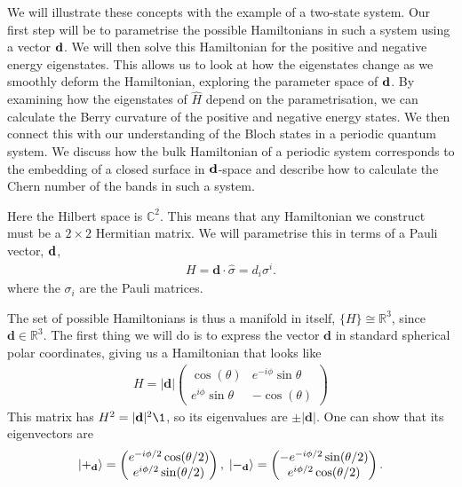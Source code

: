 We will illustrate these concepts with the example of a two-state system. Our first step will be to parametrise the possible Hamiltonians in such a system using a vector $\bf d$. We will then solve this Hamiltonian for the positive and negative energy eigenstates. This allows us to look at how the eigenstates change as we smoothly deform the Hamiltonian, exploring the parameter space of $\bf d$. By examining how the eigenstates of $\hat H$ depend on the parametrisation, we can calculate the Berry curvature of the positive and negative energy states. We then connect this with our understanding of the Bloch states in a periodic quantum system. We discuss how the bulk Hamiltonian of a periodic system corresponds to the embedding of a closed surface in $\bf d$-space and describe how to calculate the Chern number of the bands in such a system.\par
Here the Hilbert space is $\mathbb{C}^2$. This means that any Hamiltonian we construct must be a $2\times 2$ Hermitian matrix. We will parametrise this in terms of a Pauli vector, $\bf d$,
\begin{align}
    H = \textbf{d}\cdot\hat{\sigma}  = d_i \sigma^i.
\end{align}
where the $\sigma_i$ are the Pauli matrices.\par
The set of possible Hamiltonians is thus a manifold in itself, $ \{H\} \cong \mathbb{R}^3 $, since $\textbf{d} \in \mathbb{R}^3 $. The first thing we will do is to express the vector $\textbf{d}$ in standard spherical polar coordinates, giving us a Hamiltonian that looks like
\begin{align}
    H = |\textbf{d}|\begin{pmatrix}
\cos(\theta) &e^{-i\phi}\sin{\theta} \\ 
 e^{i\phi}\sin{\theta}& -\cos(\theta)
\end{pmatrix}
\end{align}
This matrix has $H^2 = |\textbf{d}|^2 \1 $, so its eigenvalues are $\pm |\textbf{d}|$. One can show that its eigenvectors are
\begin{align}\label{states}
    \ket{+_{\textbf{d}}} = \begin{pmatrix}
e^{-i\phi/2}\cos(\theta/2)\\ 
e^{i\phi/2} \sin(\theta/2)
\end{pmatrix},\; \ket{-_{\textbf{d}}} = \begin{pmatrix}
-e^{-i\phi/2}\sin(\theta/2)\\ 
e^{i\phi/2} \cos(\theta/2)
\end{pmatrix}.
\end{align}
